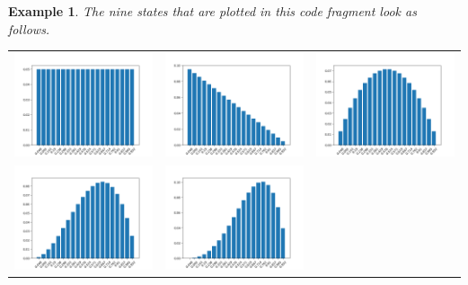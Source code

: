 \documentclass[leqno]{tufte-book} %
\newtheorem{example}[theorem]{Example}
\begin{document}
\begin{example}
\noindent The nine states that are plotted in this code
fragment look as follows.
\begin{center}
\begin{tabular}{ccc}
\includegraphics[width=15em]{Pictures/disc_coin_parameter-0.png} 
&
\includegraphics[width=15em]{Pictures/disc_coin_parameter-1.png}
&
\includegraphics[width=15em]{Pictures/disc_coin_parameter-2.png}
\\
\includegraphics[width=15em]{Pictures/disc_coin_parameter-3.png} 
&
\includegraphics[width=15em]{Pictures/disc_coin_parameter-4.png}

\end{tabular}
\end{center}
\end{example}
\end{document}
